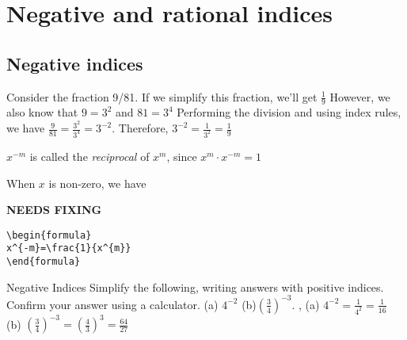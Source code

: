 \documentclass[../../main.tex]{subfiles}
\begin{document}
\section{Negative and rational indices}
\subsection{Negative indices}
Consider the fraction 9/81.
If we simplify this fraction, we'll get $\frac{1}{9}$
However, we also know that $9=3^{2}$ and $81=3^{4}$
Performing the division and using index rules, we have $\frac{9}{81}=\frac{3^{2}}{3^{4}}=3^{-2}$.
Therefore, $3^{-2}=\frac{1}{3^2}=\frac{1}{9}$

$x^{-m}$ is called the \textit{reciprocal} of $x^{m}$, since $x^{m} \cdot x^{-m}=1$ %

When $x$ is non-zero, we have

{\hfill\Large\bfseries NEEDS FIXING\hfill}
\begin{lstlisting}
\begin{formula}
x^{-m}=\frac{1}{x^{m}} 
\end{formula}
 \end{lstlisting}
\begin{example}{Negative Indices}
Simplify the following, writing answers with positive indices. Confirm your answer using a calculator.
(a) $4^{-2}$ \hspace{1cm} (b)$\left(\frac{3}{4}\right)^{-3}$.
\sep
(a) $4^{-2}=\frac{1}{4^2}=\frac{1}{16}$$$$$
(b) $\left(\frac{3}{4}\right)^{-3}=\left(\frac{4}{3}\right)^{3}=\frac{64}{27}$
\end{example}
\end{document}
